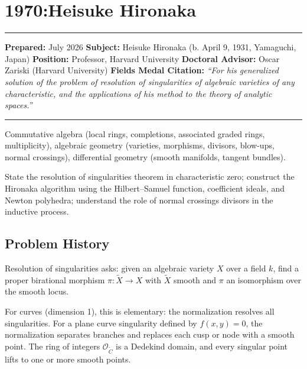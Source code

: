 \chapter{1970:Heisuke Hironaka}\label{ch1970heisukehironaka:heisuke-hironaka-fields-medal-1970-a-comprehensive-report}

\begin{center}\rule{0.5\linewidth}{0.5pt}\end{center}

\textbf{Prepared:} July 2026
\textbf{Subject:} Heisuke Hironaka (b. April 9, 1931, Yamaguchi, Japan)
\textbf{Position:} Professor, Harvard University
\textbf{Doctoral Advisor:} Oscar Zariski (Harvard University)
\textbf{Fields Medal Citation:} \emph{``For his generalized solution of the problem of resolution of singularities of algebraic varieties of any characteristic, and the applications of his method to the theory of analytic spaces.''}

\begin{center}\rule{0.5\linewidth}{0.5pt}\end{center}

\begin{prereqs}
Commutative algebra (local rings, completions, associated graded rings, multiplicity), algebraic geometry (varieties, morphisms, divisors, blow-ups, normal crossings), differential geometry (smooth manifolds, tangent bundles).
\end{prereqs}

\begin{objectives}
State the resolution of singularities theorem in characteristic zero; construct the Hironaka algorithm using the Hilbert--Samuel function, coefficient ideals, and Newton polyhedra; understand the role of normal crossings divisors in the inductive process.
\end{objectives}

\section{Problem History}

Resolution of singularities asks: given an algebraic variety $X$ over a field $k$, find a proper birational morphism $\pi: \tilde{X} \to X$ with $\tilde{X}$ smooth and $\pi$ an isomorphism over the smooth locus.

For curves (dimension 1), this is elementary: the normalization resolves all singularities. For a plane curve singularity defined by $f(x,y) = 0$, the normalization separates branches and replaces each cusp or node with a smooth point. The ring of integers $\mathcal{O}_{\tilde{C}}$ is a Dedekind domain, and every singular point lifts to one or more smooth points.

